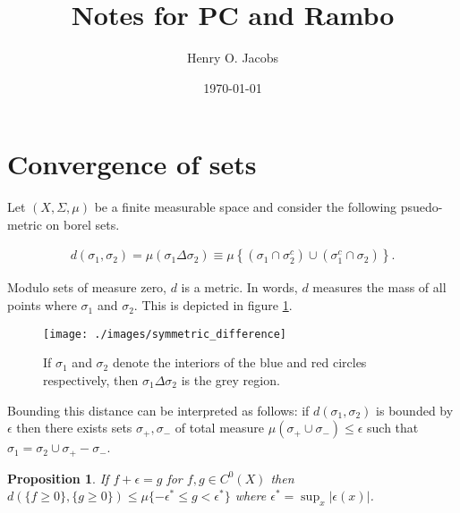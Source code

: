 \documentclass[12pt]{amsart}
\title{Notes for PC and Rambo}
\author{Henry O. Jacobs}
\date{\today}
\newtheorem{prop}[thm]{Proposition}
\begin{document}
\maketitle

\section{Convergence of sets}
Let $(X,\Sigma, \mu)$ be a finite measurable space and consider the following psuedo-metric on borel sets.

\begin{align*}
	d(\sigma_{1}, \sigma_{2}) = \mu( \sigma_{1} \Delta \sigma_{2}) \equiv \mu \left\{ (\sigma_{1} \cap \sigma_{2}^{c} ) \cup  (\sigma_{1}^{c} \cap \sigma_{2}) \right\}.
\end{align*}

Modulo sets of measure zero, $d$ is a metric.  In words, $d$ measures the mass of all points where $\sigma_{1}$ and $\sigma_{2}$.
This is depicted in figure \ref{fig:symmetric difference}.

\begin{figure}[h!]
	\centering
	\texttt{[image: ./images/symmetric\_difference]}
	\caption{If $\sigma_{1}$ and $\sigma_{2}$ denote the interiors of the blue and red circles respectively,
	then $\sigma_{1} \Delta \sigma_{2}$ is the grey region.}
	\label{fig:symmetric difference}
\end{figure}

Bounding this distance can be interpreted as follows: if $d(\sigma_{1} , \sigma_{2} )$ is bounded by $\epsilon$ then there exists sets $\sigma_{+}, \sigma_{-}$ of total measure $\mu( \sigma_{+} \cup \sigma_{-}) \leq \epsilon$ such that $\sigma_{1} = \sigma_{2} \cup \sigma_{+} - \sigma_{-}$.


\begin{prop} \label{prop:sublevel sets}
	If $f +\epsilon = g$ for $f,g \in C^{0}(X)$ then $d( \{ f \geq 0 \}  , \{ g \geq 0 \} ) \leq \mu\{ -\epsilon^{*} \leq g < \epsilon^{*} \}$ where $\epsilon^{*} = \sup_{x} | \epsilon(x) |$.
\end{prop}
\end{document}
